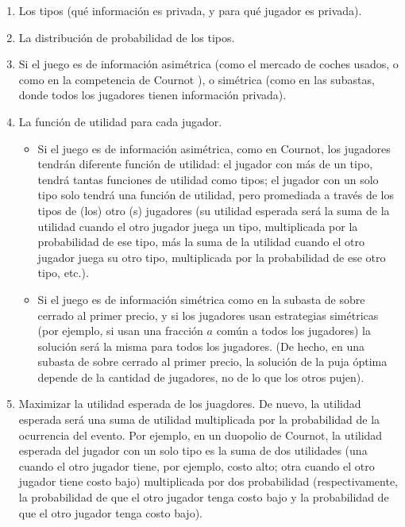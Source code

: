 \documentclass[12pt]{article}
\begin{document}
\begin{enumerate}
	\setlength{\itemsep}{0pt}
	\setlength{\parskip}{0pt}
	\setlength{\parsep}{0pt}
	\item Los tipos (qué información es privada, y para qué jugador es privada).
	\item La distribución de probabilidad de los tipos.
	\item Si el juego es de información asimétrica (como el mercado de coches usados, o como en la competencia de Cournot ), o simétrica (como en las subastas, donde todos los jugadores tienen información privada).
	\item La función de utilidad para cada jugador.
	      \begin{itemize}
		      \item Si el juego es de información asimétrica, como en Cournot, los jugadores tendrán diferente función de utilidad: el jugador con más de un tipo, tendrá tantas funciones de utilidad como tipos; el jugador con un solo tipo solo tendrá una función de utilidad, pero promediada a través de los tipos de (los) otro (s) jugadores (su utilidad esperada será la suma de la utilidad cuando el otro jugador juega un tipo, multiplicada por la probabilidad de ese tipo, más la suma de la utilidad cuando el otro jugador juega su otro tipo, multiplicada por la probabilidad de ese otro tipo, etc.).
		      \item Si el juego es de información simétrica como en la subasta de sobre cerrado al primer precio, y si los jugadores usan estrategias simétricas (por ejemplo, si usan una fracción $ a $ común a todos los jugadores) la solución será la misma para todos los jugadores. (De hecho, en una subasta de sobre cerrado al primer precio, la solución de la puja óptima depende de la cantidad de jugadores, no de lo que los otros pujen).
	      \end{itemize}
	\item Maximizar la utilidad esperada de los juagdores. De nuevo, la utilidad esperada será una suma de utilidad multiplicada por la probabilidad de la ocurrencia del evento. Por ejemplo, en un duopolio de Cournot, la utilidad esperada del jugador con un solo tipo es la suma de dos utilidades (una cuando el otro jugador tiene, por ejemplo, costo alto; otra cuando el otro jugador tiene costo bajo) multiplicada por dos probabilidad (respectivamente, la probabilidad de que el otro jugador tenga costo bajo y la probabilidad de que el otro jugador tenga costo bajo).
\end{enumerate}
\end{document}

